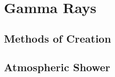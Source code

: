 \cleartooddpage[\thispagestyle{empty}]
\chapter{Gamma Rays}

\section{Methods of Creation}

\section{Atmospheric Shower}

